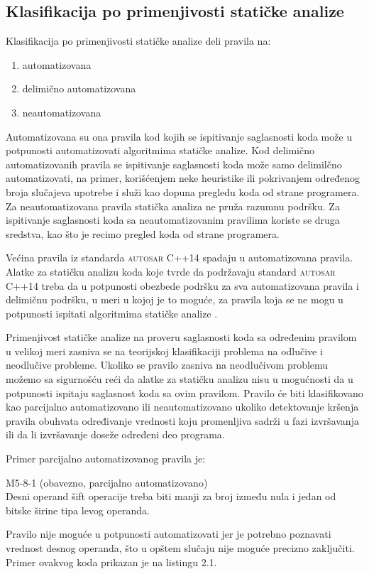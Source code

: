 \documentclass[12pt,oneside]{memoir}
\begin{document}
\subsection{Klasifikacija po primenjivosti statičke analize}
Klasifikacija po primenjivosti statičke analize deli pravila na: 
\begin{enumerate}
  \item{automatizovana}
  \item{delimično automatizovana}
  \item{neautomatizovana}
\end{enumerate}
Automatizovana su ona pravila kod kojih se ispitivanje saglasnosti koda može u potpunosti automatizovati algoritmima statičke analize.
Kod delimično automatizovanih pravila se ispitivanje saglasnosti koda može samo delimilčno automatizovati, na primer, korišćenjem neke heuristike ili pokrivanjem određenog broja slučajeva upotrebe i služi kao dopuna pregledu koda od strane programera.
Za neautomatizovana pravila statička analiza ne pruža razumnu podršku. Za ispitivanje saglasnosti koda sa neautomatizovanim pravilima koriste se druga sredstva, kao što je recimo pregled koda od strane programera.

\indent
Većina pravila iz standarda \textsc{autosar} C++14 spadaju u automatizovana pravila. Alatke za statičku analizu koda koje tvrde da podržavaju standard \textsc{autosar} C++14 treba da u potpunosti obezbede podršku za sva automatizovana pravila i delimičnu podršku, u meri u kojoj je to moguće, za pravila koja se ne mogu u potpunosti ispitati algoritmima statičke analize \cite{AutosarGuidelines}.

\indent
Primenjivost statičke analize na proveru saglasnosti koda sa određenim pravilom u velikoj meri zasniva se na teorijskoj klasifikaciji problema
na odlučive i neodlučive probleme. Ukoliko se pravilo zasniva na neodlučivom problemu možemo sa sigurnošću reći da alatke za statičku analizu nisu u mogućnosti da u potpunosti ispitaju saglasnost koda sa ovim pravilom. Pravilo će biti klasifikovano kao parcijalno automatizovano ili neautomatizovano ukoliko detektovanje kršenja pravila obuhvata određivanje vrednosti koju promenljiva sadrži u fazi izvr\v{s}avanja ili da li izvr\v{s}avanje doseže određeni deo programa.

Primer parcijalno automatizovanog pravila je: 

\begin{center}

\begin{tcolorbox}
 M5-8-1 (obavezno, parcijalno automatizovano) \\
Desni operand šift operacije treba biti manji za broj između nula i jedan
od bitske širine tipa levog operanda.

\end{tcolorbox}
\end{center}
  \noindent
  Pravilo nije moguće u potpunosti automatizovati jer je potrebno poznavati vrednost desnog operanda, što u opštem slučaju nije
  moguće precizno zaključiti. Primer ovakvog koda prikazan je na listingu 2.1. \\
\end{document}
